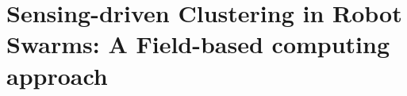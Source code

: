 
\newcommand{\LP}[2]{\marginpar{$\color{red}\star$}\color{gray}\sout{#1}\color{blue}\
  #2 \color{black}}
\newcommand{\LPr}[2]{{\color{gray}\ #1\ \color{orange}\  #2}}


\chapter[Sensing-driven Clustering in Robot Swarms]{Sensing-driven Clustering in Robot Swarms: A Field-based computing approach}
\minitoc%


%
%
%

